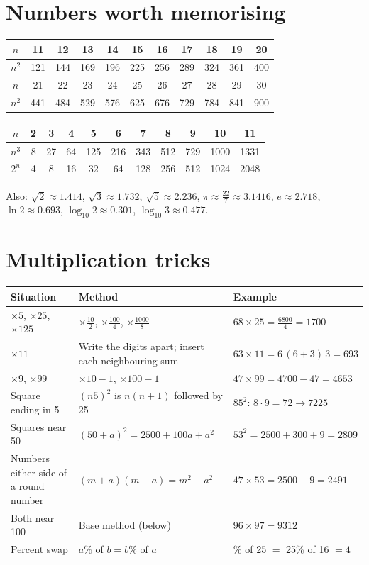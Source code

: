 \documentclass[11pt,a4paper,openany]{report}
\begin{document}
\section{Numbers worth memorising}
\begin{center}\small
\begin{tabular}{c|cccccccccc}
$n$ &11&12&13&14&15&16&17&18&19&20\\\hline
$n^2$ &121&144&169&196&225&256&289&324&361&400\\\hline\hline
$n$ &21&22&23&24&25&26&27&28&29&30\\\hline
$n^2$ &441&484&529&576&625&676&729&784&841&900
\end{tabular}

\medskip
\begin{tabular}{c|cccccccccc}
$n$ &2&3&4&5&6&7&8&9&10&11\\\hline
$n^3$ &8&27&64&125&216&343&512&729&1000&1331\\\hline
$2^n$ &4&8&16&32&64&128&256&512&1024&2048
\end{tabular}
\end{center}
Also: $\sqrt2\approx1.414$, $\sqrt3\approx1.732$, $\sqrt5\approx2.236$, $\pi\approx\frac{22}7\approx3.1416$, $e\approx2.718$, $\ln2\approx0.693$, $\log_{10}2\approx0.301$, $\log_{10}3\approx0.477$.

\section{Multiplication tricks}
\begin{center}\small
\begin{tabular}{>{\raggedright}p{3.6cm}>{\raggedright}p{5.6cm}>{\raggedright\arraybackslash}p{5cm}}
\toprule
Situation & Method & Example\\\midrule
$\times5$, $\times25$, $\times125$ & $\times\frac{10}2$, $\times\frac{100}4$, $\times\frac{1000}8$ & $68\times25=\frac{6800}4=1700$\\
$\times11$ & Write the digits apart; insert each neighbouring sum & $63\times11=6\,(6{+}3)\,3=693$\\
$\times9$, $\times99$ & $\times10-1$, $\times100-1$ & $47\times99=4700-47=4653$\\
Square ending in 5 & $(n5)^2$ is $n(n+1)$ followed by 25 & $85^2$: $8\cdot9=72\to7225$\\
Squares near 50 & $(50+a)^2=2500+100a+a^2$ & $53^2=2500+300+9=2809$\\
Numbers either side of a round number & $(m+a)(m-a)=m^2-a^2$ & $47\times53=2500-9=2491$\\
Both near 100 & Base method (below) & $96\times97=9312$\\
Percent swap & $a\%$ of $b=b\%$ of $a$ & 16\% of 25 $=$ 25\% of 16 $=4$\\
\bottomrule
\end{tabular}
\end{center}
\end{document}
